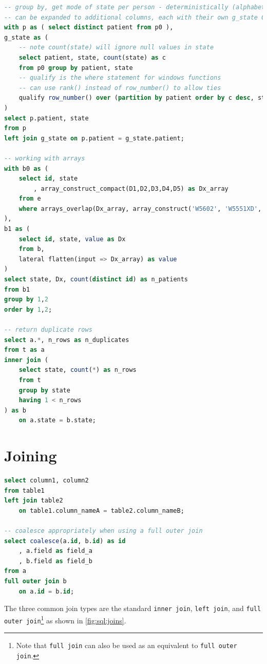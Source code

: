 \begin{lstlisting}[language=SQL]
-- group by, get mode of state per person - deterministically (alphabetical order)
-- can be expanded to additional columns, each with their own g_state CTEs
with p as ( select distinct patient from p0 ),
g_state as (
	-- note count(state) will ignore null values in state
	select patient, state, count(state) as c
	from p0 group by patient, state
	-- qualify is the where statement for windows functions
	-- can use rank() instead of row_number() to allow ties
	qualify row_number() over (partition by patient order by c desc, state asc) = 1
)
select p.patient, state
from p
left join g_state on p.patient = g_state.patient;

-- working with arrays
with b0 as (
	select id, state
		, array_construct_compact(D1,D2,D3,D4,D5) as Dx_array
	from e
	where arrays_overlap(Dx_array, array_construct('W5602', 'W5551XD', 'W5803XA'))
),
b1 as (
	select id, state, value as Dx
	from b,
	lateral flatten(input => Dx_array) as value
)
select state, Dx, count(distinct id) as n_patients
from b1
group by 1,2
order by 1,2;

-- return duplicate rows
select a.*, n_rows as n_duplicates
from t as a
inner join (
	select state, count(*) as n_rows
	from t
	group by state
	having 1 < n_rows
) as b
	on a.state = b.state;
\end{lstlisting}

\section{Joining}
\label{sql:join}

\begin{lstlisting}[language=SQL]
select column1, column2
from table1
left join table2
	on table1.column_nameA = table2.column_nameB;

-- coalesce appropriately when using a full outer join
select coalesce(a.id, b.id) as id
	, a.field as field_a
	, b.field as field_b
from a
full outer join b
	on a.id = b.id;
\end{lstlisting}

The three common join types are the standard
\texttt{inner join}, \texttt{left join},
and \texttt{full outer join}\footnote{Note that \texttt{full join} can also be used as an equivalent to \texttt{full outer join}.} as
shown in \cref{fig:sql:joins}.

